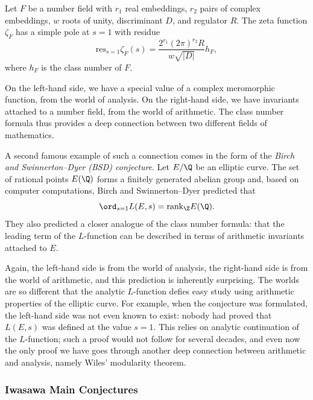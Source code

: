\documentclass[a4paper,10pt, english, reqno]{smfart}
\numberwithin{equation}{section}
\begin{document}
\begin{theorem}\label{thm:class number formula}
	Let $F$ be a number field with $r_1$ real embeddings, $r_2$ pairs of complex embeddings, $w$ roots of unity, discriminant $D$, and regulator $R$. The zeta function $\zeta_F$ has a simple pole at $s=1$ with residue
	\[\mathrm{res}_{s=1}\zeta_F(s) = \frac{2^{r_1}(2\pi)^{r_2} R}{w\sqrt{|D|}}h_F,\]
	where $h_F$ is the class number of $F$.
\end{theorem}
On the left-hand side, we have a special value of a complex
meromorphic function, from the world of analysis. On the right-hand side, we have invariants attached to a number field, from the world of arithmetic. The class number formula thus provides a deep connection between two different fields of mathematics.

A second famous example of such a connection comes in the form of the \emph{Birch and Swinnerton--Dyer (BSD) conjecture}. Let $E/\Q$ be an elliptic curve. The set of rational points $E(\Q)$ forms a finitely generated abelian group and, based on computer computations, Birch and Swinnerton--Dyer predicted that 
\[
\ord_{s=1}L(E,s) = \mathrm{rank}_{\Z}E(\Q).
\]
They also predicted a closer analogue of the class number formula: that the leading term of the $L$-function can be described in terms of arithmetic invariants attached to $E$.

Again, the left-hand side is from the world of analysis, the right-hand side is from the world of arithmetic, and this prediction is inherently surprising. The worlds are so different that the analytic $L$-function defies easy study using arithmetic properties of the elliptic curve. For example, when the conjecture was formulated, the left-hand side was not even known to exist: nobody had proved that $L(E,s)$ was defined at the value $s=1$. This relies on analytic continuation of the $L$-function; such a proof would not follow for several decades, and even now the only proof we have goes through another deep connection between arithmetic and analysis, namely Wiles' modularity theorem. 

\subsubsection{Iwasawa Main Conjectures}
\end{document}
